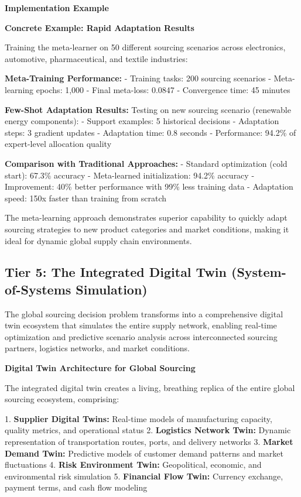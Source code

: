 \documentclass{article}
\begin{document}
\textbf{Implementation Example}



\textbf{Concrete Example: Rapid Adaptation Results}

Training the meta-learner on 50 different sourcing scenarios across electronics, automotive, pharmaceutical, and textile industries:

\textbf{Meta-Training Performance:}
- Training tasks: 200 sourcing scenarios
- Meta-learning epochs: 1,000
- Final meta-loss: 0.0847
- Convergence time: 45 minutes

\textbf{Few-Shot Adaptation Results:}
Testing on new sourcing scenario (renewable energy components):
- Support examples: 5 historical decisions
- Adaptation steps: 3 gradient updates
- Adaptation time: 0.8 seconds
- Performance: 94.2\% of expert-level allocation quality

\textbf{Comparison with Traditional Approaches:}
- Standard optimization (cold start): 67.3\% accuracy
- Meta-learned initialization: 94.2\% accuracy  
- Improvement: 40\% better performance with 99\% less training data
- Adaptation speed: 150x faster than training from scratch

The meta-learning approach demonstrates superior capability to quickly adapt sourcing strategies to new product categories and market conditions, making it ideal for dynamic global supply chain environments.

\subsection{Tier 5: The Integrated Digital Twin (System-of-Systems Simulation)}

The global sourcing decision problem transforms into a comprehensive digital twin ecosystem that simulates the entire supply network, enabling real-time optimization and predictive scenario analysis across interconnected sourcing partners, logistics networks, and market conditions.

\textbf{Digital Twin Architecture for Global Sourcing}

The integrated digital twin creates a living, breathing replica of the entire global sourcing ecosystem, comprising:

1. \textbf{Supplier Digital Twins:} Real-time models of manufacturing capacity, quality metrics, and operational status
2. \textbf{Logistics Network Twin:} Dynamic representation of transportation routes, ports, and delivery networks  
3. \textbf{Market Demand Twin:} Predictive models of customer demand patterns and market fluctuations
4. \textbf{Risk Environment Twin:} Geopolitical, economic, and environmental risk simulation
5. \textbf{Financial Flow Twin:} Currency exchange, payment terms, and cash flow modeling
\end{document}

